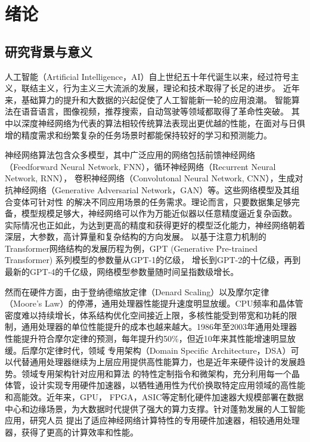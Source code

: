 \chapter{绪\hspace{6pt}论}

\section{研究背景与意义}
人工智能（Artificial Intelligence，AI）自上世纪五十年代诞生以来，经过符号主义，联结主义，行为主义三大流派的发展，理论和技术取得了长足的进步。
近年来，基础算力的提升和大数据的兴起促使了人工智能新一轮的应用浪潮。
智能算法在语音语言，图像视频，推荐搜索，自动驾驶等领域都取得了革命性突破。
其中以深度神经网络为代表的算法相较传统算法表现出更优越的性能，在面对与日俱增的精度需求和纷繁复杂的任务场景时都能保持较好的学习和预测能力。

神经网络算法包含众多模型，其中广泛应用的网络包括前馈神经网络（Feedforward Neural Network, FNN），循环神经网络（Recurrent Neural Network, RNN），
卷积神经网络（Convolutonal Neural Network, CNN），生成对抗神经网络（Generative Adversarial Network，GAN）等。这些网络模型及其组合变体可针对性
的解决不同应用场景的任务需求。理论而言，只要数据集足够完备，模型规模足够大，神经网络可以作为万能近似器以任意精度逼近复杂函数。
实际情况也正如此，为达到更高的精度和获得更好的模型泛化能力，神经网络朝着深层，大参数，高计算量和复杂结构的方向发展。
以基于注意力机制的Transformer网络结构的发展历程为例，GPT (Generative Pre-trained Transformer) 系列模型的参数量从GPT-1的亿级，
增长到GPT-2的十亿级，再到最新的GPT-4的千亿级，网络模型参数量随时间呈指数级增长。

然而在硬件方面，由于登纳德缩放定律（Denard Scaling）以及摩尔定律（Moore's Law）的停滞，通用处理器性能提升速度明显放缓。CPU频率和晶体管
密度难以持续增长，体系结构优化空间接近上限，多核性能受到带宽和功耗的限制，通用处理器的单位性能提升的成本也越来越大。1986年至2003年通用处理器
性能提升符合摩尔定律的预测，每年提升约50\%，但近10年来其性能增速明显放缓。后摩尔定律时代，领域
专用架构（Domain Specific Architecture，DSA）可以代替通用处理器继续为上层应用提供高性能算力，也是近年来硬件设计的发展趋势。领域专用架构针对应用和算法
的特性定制指令和微架构，充分利用每一个晶体管，设计实现专用硬件加速器，以牺牲通用性为代价换取特定应用领域的高性能和高能效。近年来，GPU，
FPGA，ASIC等定制化硬件加速器大规模部署在数据中心和边缘场景，为大数据时代提供了强大的算力支撑。针对蓬勃发展的人工智能应用，研究人员
提出了适应神经网络计算特性的专用硬件加速器，相较通用处理器，获得了更高的计算效率和性能。

